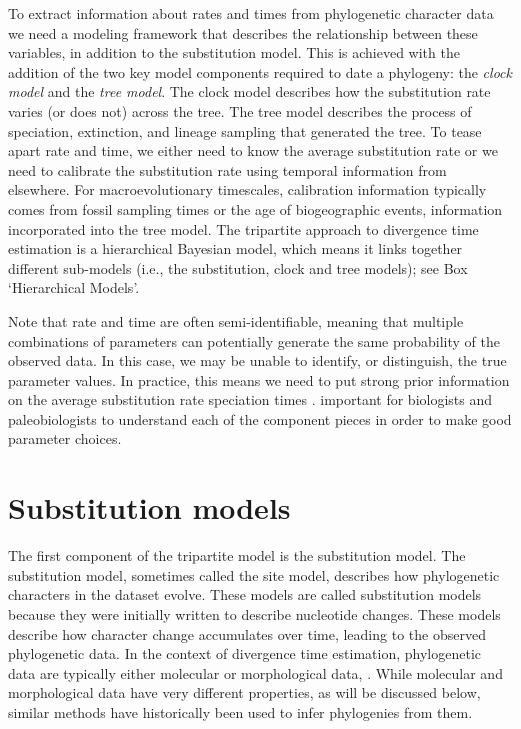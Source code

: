 To extract information about rates and times from phylogenetic character data we need a modeling framework that describes the  relationship between these variables, in addition to the substitution model.
This is achieved with the addition of the two key model components required to date a phylogeny: the \textit{clock model} and the \textit{tree model}.
The clock model describes how the substitution rate varies (or does not) across the tree.
The tree model describes the process of speciation, extinction, and lineage sampling that generated the tree.
To tease apart rate and time, we either need to know the average substitution rate or we need to calibrate the substitution rate using temporal information from elsewhere.
For macroevolutionary timescales, calibration information typically comes from fossil sampling times or the age of biogeographic events, information incorporated into the tree model.
The tripartite approach to divergence time estimation is a hierarchical Bayesian model, which means it links together different sub-models (i.e., the substitution, clock and tree models); see Box `Hierarchical Models'.

Note that rate and time are often semi-identifiable, meaning that multiple combinations of parameters can potentially generate the same probability of the observed data.
In this case, we may be unable to identify, or distinguish, the true parameter values.
In practice, this means we need to put strong prior information on the average substitution rate  speciation times \citep{dosReis2013,dosReis2016}.
 important for biologists and paleobiologists to understand each of the component pieces in order to make good parameter choices.

\section{Substitution models}

The first component of the tripartite model is the substitution model.
The substitution model, sometimes called the site model, describes how phylogenetic characters in the dataset evolve.
These models are called substitution models because they were initially written to describe nucleotide changes.
These models describe how character change accumulates over time, leading to the observed phylogenetic data.
In the context of divergence time estimation, phylogenetic data are typically either molecular or morphological data, .
While molecular and morphological data have very different properties, as will be discussed below, similar methods have historically been used to infer phylogenies from them.

